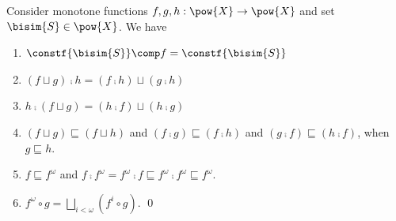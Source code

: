\begin{lemma}\label{lem:fcl}
  Consider monotone functions $f,g,h: \pow{X}\rightarrow \pow{X}$ and set ${\bisim{S}}\in\pow{X}$. We have
  \begin{enumerate}
    \item $\constf{\bisim{S}} \comp f = \constf{\bisim{S}}$
    \item $(f\sqcup g)\comp h = (f\comp h) \sqcup (g \comp h)$
    \item $h\comp(f\sqcup g) = (h\comp f) \sqcup (h\comp g)$
    \item $(f\sqcup g) \sqsubseteq (f\sqcup h)$ and
          $(f\comp g) \sqsubseteq (f\comp h)$ and
          $(g\comp f) \sqsubseteq (h\comp f)$, when $g\sqsubseteq h$.
    \item
      $f \sqsubseteq f^\omega$ and $f \comp f^\omega = f^\omega \comp f \sqsubseteq f^\omega \comp f^\omega \sqsubseteq f^\omega$.
      \item $f^\omega\circ g = \bigsqcup_{i<\omega}(f^i\circ g)$.
      \qed
  \end{enumerate}
\end{lemma}

